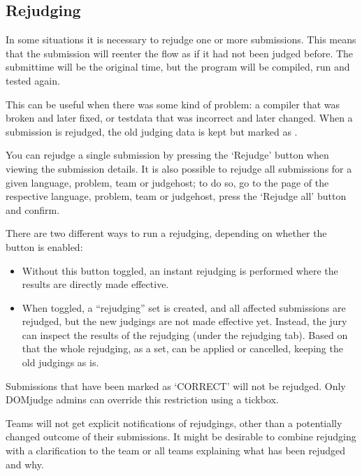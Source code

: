 \documentclass[a4paper,10pt,english,openany]{sphinxmanual}
\begin{document}
\subsection{Rejudging}
\label{\detokenize{judging:rejudging}}\label{\detokenize{judging:id1}}
\sphinxAtStartPar
In some situations it is necessary to rejudge one or more submissions. This means
that the submission will re\sphinxhyphen{}enter the flow as if it had not been
judged before. The submittime will be the original time, but the
program will be compiled, run and tested again.

\sphinxAtStartPar
This can be useful when there was some kind of problem: a compiler
that was broken and later fixed, or testdata that was incorrect and
later changed. When a submission is rejudged, the old judging data is
kept but marked as .

\sphinxAtStartPar
You can rejudge a single submission by pressing the ‘Rejudge’ button
when viewing the submission details. It is also possible to rejudge
all submissions for a given language, problem, team or judgehost; to
do so, go to the page of the respective language, problem, team or
judgehost, press the ‘Rejudge all’ button and confirm.

\sphinxAtStartPar
There are two different ways to run a rejudging, depending on whether
the  button is enabled:
\begin{itemize}
\item {} 
\sphinxAtStartPar
Without this button toggled, an instant rejudging is
performed where the results are directly made effective.

\item {} 
\sphinxAtStartPar
When toggled, a “rejudging” set is created, and all affected
submissions are rejudged, but the new judgings are not made
effective yet. Instead, the jury can inspect the results of the
rejudging (under the rejudging tab). Based on that the whole
rejudging, as a set, can be applied or cancelled, keeping the old
judgings as is.

\end{itemize}

\sphinxAtStartPar
Submissions that have been marked as ‘CORRECT’ will not be rejudged.
Only DOMjudge admins can override this restriction using a tickbox.

\sphinxAtStartPar
Teams will not get explicit notifications of rejudgings, other than a
potentially changed outcome of their submissions. It might be desirable
to combine rejudging with a clarification to the team or all teams
explaining what has been rejudged and why.
\end{document}
